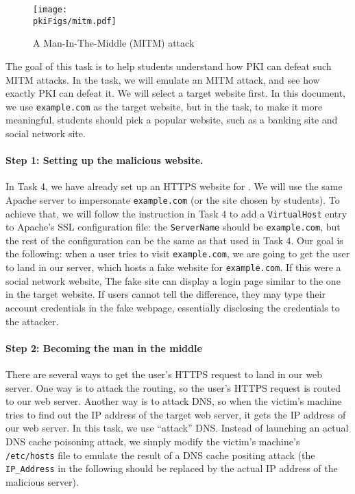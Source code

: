 \begin{figure}[htb]
   \begin{center}
      \texttt{[image: \\pkiFigs/mitm.pdf]}
   \end{center}
   \caption{A Man-In-The-Middle (MITM) attack}
   \label{pki:fig:mitm}
\end{figure}



The goal of this task is to help students understand how PKI can defeat such MITM attacks. 
In the task, we will emulate an MITM attack, and see how exactly PKI can defeat it.
We will select a target website first. In this document, we use 
\texttt{example.com} as the target website, but in the task, to make it more meaningful,
students should pick a popular website, such as a banking site and social network site. 


\paragraph{Step 1: Setting up the malicious website.} 
In Task 4, we have already set up an HTTPS website for \pkiserver. We will
use the same Apache server to impersonate \texttt{example.com} (or the site chosen by students).  
To achieve that, we will follow the instruction in Task 4 to 
add a \texttt{VirtualHost} entry to Apache's SSL configuration file: the
\texttt{ServerName} should be \texttt{example.com}, but the rest of the
configuration can be the same as that used in Task 4.
Our goal is the following: when a user tries to visit \texttt{example.com}, 
we are going to get the user to land in our server, which hosts 
a fake website for \texttt{example.com}. If this were a social network
website, The fake site can display a login page similar to the
one in the target website. If users cannot tell the difference, they may type their account credentials
in the fake webpage, essentially disclosing the credentials to the attacker. 


\paragraph{Step 2: Becoming the man in the middle} 
There are several ways to get the user's HTTPS request to land in our web server. One way is to
attack the routing, so the user's HTTPS request is routed to our web server. Another way is
to attack DNS, so when the victim's machine tries to find out the IP address of the target
web server, it gets the IP address of our web server. In this task, we use ``attack'' DNS. Instead of
launching an actual DNS cache poisoning attack, we simply modify the victim's machine's 
\texttt{/etc/hosts} file to emulate the result of a DNS cache positing attack (the
\texttt{IP\_Address} in the following should be replaced by the actual 
IP address of the malicious server).

